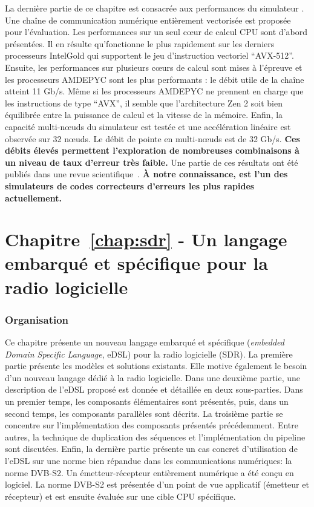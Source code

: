 La dernière partie de ce chapitre est consacrée aux performances du simulateur
\AFFECT. Une chaîne de communication numérique entièrement vectorisée est
proposée pour l'évaluation. Les performances sur un seul cœur de calcul CPU sont
d'abord présentées. Il en résulte qu'\AFFECT fonctionne le plus rapidement sur
les derniers processeurs Intel\R Gold qui supportent le jeu d'instruction
vectoriel ``AVX-512''. Ensuite, les performances sur plusieurs cœurs de calcul
sont mises à l'épreuve et les processeurs AMD\R EPYC sont les plus performants :
le débit utile de la chaîne atteint 11 Gb/s. Même si les processeurs AMD\R EPYC
ne prennent en charge que les instructions de type ``AVX'', il semble que
l'architecture Zen 2 soit bien équilibrée entre la puissance de calcul et la
vitesse de la mémoire. Enfin, la capacité multi-nœuds du simulateur \AFFECT est
testée et une accélération linéaire est observée sur 32 nœuds. Le débit de
pointe en multi-nœuds est de 32 Gb/s. \textbf{Ces débits élevés permettent
l'exploration de nombreuses combinaisons à un niveau de taux d'erreur très
faible.} Une partie de ces résultats ont été publiés dans une revue
scientifique~\cite{Cassagne2019a}. \textbf{À notre connaissance, \AFFECT est
l'un des simulateurs de codes correcteurs d'erreurs les plus rapides
actuellement.}

\section*{Chapitre~\ref{chap:sdr} - Un langage embarqué et spécifique pour la radio logicielle}

\subsubsection*{Organisation}

Ce chapitre présente un nouveau langage embarqué et spécifique (\emph{embedded
Domain Specific Language}, eDSL) pour la radio logicielle (SDR). La première
partie présente les modèles et solutions existants. Elle motive également le
besoin d'un nouveau langage dédié à la radio logicielle. Dans une deuxième
partie, une description de l'eDSL proposé est donnée et détaillée en deux
sous-parties. Dans un premier temps, les composants élémentaires sont présentés,
puis, dans un second temps, les composants parallèles sont décrits. La troisième
partie se concentre sur l'implémentation des composants présentés précédemment.
Entre autres, la technique de duplication des séquences et l'implémentation du
pipeline sont discutées. Enfin, la dernière partie présente un cas concret
d'utilisation de l'eDSL sur une norme bien répandue dans les communications
numériques: la norme DVB-S2. Un émetteur-récepteur entièrement numérique a été
conçu en logiciel. La norme DVB-S2 est présentée d'un point de vue applicatif
(émetteur et récepteur) et est ensuite évaluée sur une cible CPU spécifique.

